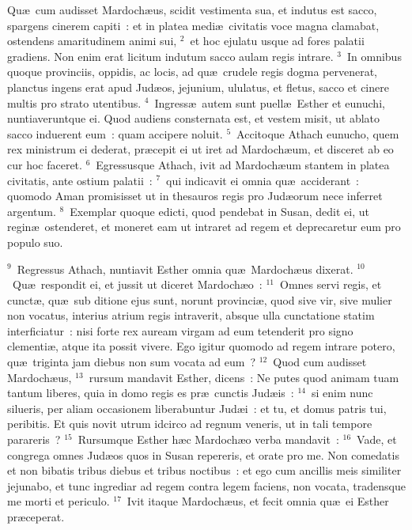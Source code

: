 \lettrine[lines=3,image=true,loversize=0.05,lraise=-0.03]{Q}{}u\ae\ cum audisset Mardoch\ae us, scidit vestimenta sua, et indutus est sacco, spargens cinerem capiti~: et in platea medi\ae\ civitatis voce magna clamabat, ostendens amaritudinem animi sui,
${}^{2}$~et hoc ejulatu usque ad fores palatii gradiens. Non enim erat licitum indutum sacco aulam regis intrare.
${}^{3}$~In omnibus quoque provinciis, oppidis, ac locis, ad qu\ae\ crudele regis dogma pervenerat, planctus ingens erat apud Jud\ae os, jejunium, ululatus, et fletus, sacco et cinere multis pro strato utentibus.
${}^{4}$~Ingress\ae\ autem sunt puell\ae\ Esther et eunuchi, nuntiaveruntque ei. Quod audiens consternata est, et vestem misit, ut ablato sacco induerent eum~: quam accipere noluit.
${}^{5}$~Accitoque Athach eunucho, quem rex ministrum ei dederat, pr\ae cepit ei ut iret ad Mardoch\ae um, et disceret ab eo cur hoc faceret.
${}^{6}$~Egressusque Athach, ivit ad Mardoch\ae um stantem in platea civitatis, ante ostium palatii~:
${}^{7}$~qui indicavit ei omnia qu\ae\ acciderant~: quomodo Aman promisisset ut in thesauros regis pro Jud\ae orum nece inferret argentum.
${}^{8}$~Exemplar quoque edicti, quod pendebat in Susan, dedit ei, ut regin\ae\ ostenderet, et moneret eam ut intraret ad regem et deprecaretur eum pro populo suo.


${}^{9}$~Regressus Athach, nuntiavit Esther omnia qu\ae\ Mardoch\ae us dixerat.
${}^{10}$~Qu\ae\ respondit ei, et jussit ut diceret Mardoch\ae o~:
${}^{11}$~Omnes servi regis, et cunct\ae , qu\ae\ sub ditione ejus sunt, norunt provinci\ae , quod sive vir, sive mulier non vocatus, interius atrium regis intraverit, absque ulla cunctatione statim interficiatur~: nisi forte rex auream virgam ad eum tetenderit pro signo clementi\ae , atque ita possit vivere. Ego igitur quomodo ad regem intrare potero, qu\ae\ triginta jam diebus non sum vocata ad eum~?
${}^{12}$~Quod cum audisset Mardoch\ae us,
${}^{13}$~rursum mandavit Esther, dicens~: Ne putes quod animam tuam tantum liberes, quia in domo regis es pr\ae\ cunctis Jud\ae is~:
${}^{14}$~si enim nunc silueris, per aliam occasionem liberabuntur Jud\ae i~: et tu, et domus patris tui, peribitis. Et quis novit utrum idcirco ad regnum veneris, ut in tali tempore parareris~?
${}^{15}$~Rursumque Esther h\ae c Mardoch\ae o verba mandavit~:
${}^{16}$~Vade, et congrega omnes Jud\ae os quos in Susan repereris, et orate pro me. Non comedatis et non bibatis tribus diebus et tribus noctibus~: et ego cum ancillis meis similiter jejunabo, et tunc ingrediar ad regem contra legem faciens, non vocata, tradensque me morti et periculo.
${}^{17}$~Ivit itaque Mardoch\ae us, et fecit omnia qu\ae\ ei Esther pr\ae ceperat.

